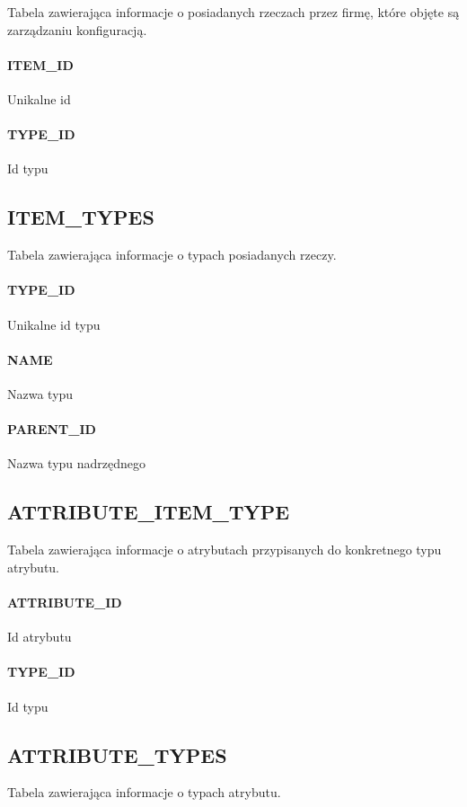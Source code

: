 \documentclass[a4paper, oneside, 11pt]{report}
\begin{document}
Tabela zawierająca informacje o posiadanych rzeczach przez firmę, które objęte są zarządzaniu konfiguracją.

\paragraph{ITEM\_ID} Unikalne id
\paragraph{TYPE\_ID} Id typu

\subsection{ITEM\_TYPES}

Tabela zawierająca informacje o typach posiadanych rzeczy.

\paragraph{TYPE\_ID} Unikalne id typu
\paragraph{NAME} Nazwa typu
\paragraph{PARENT\_ID} Nazwa typu nadrzędnego

\subsection{ATTRIBUTE\_ITEM\_TYPE}

Tabela zawierająca informacje o atrybutach przypisanych do konkretnego typu atrybutu.

\paragraph{ATTRIBUTE\_ID} Id atrybutu
\paragraph{TYPE\_ID} Id typu

\subsection{ATTRIBUTE\_TYPES}

Tabela zawierająca informacje o typach atrybutu.
\end{document}
